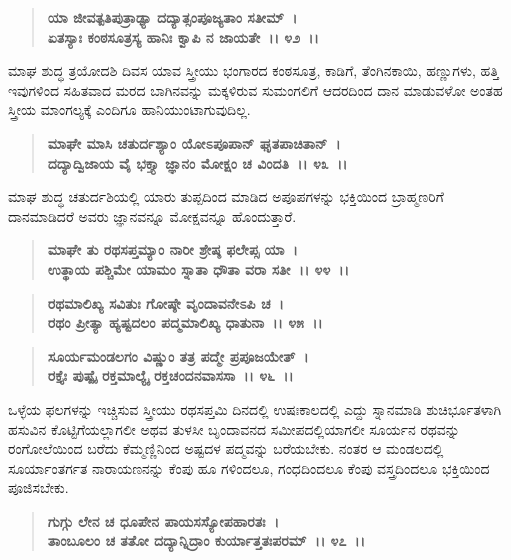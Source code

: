 \begin{verse}
\textbf{ಯಾ ಜೀವತ್ಪತಿಪುತ್ರಾಢ್ಯಾ ದದ್ಯಾತ್ಸಂಪೂಜ್ಯತಾಂ ಸತೀಮ್~।}\\\textbf{ಏತಸ್ಯಾಃ ಕಂಠಸೂತ್ರಸ್ಯ ಹಾನಿಃ ಕ್ವಾಪಿ ನ ಜಾಯತೇ~।। ೪೨~।।}
\end{verse}

ಮಾಘ ಶುದ್ಧ ತ್ರಯೋದಶಿ ದಿವಸ ಯಾವ ಸ್ತ್ರೀಯು ಭಂಗಾರದ ಕಂಠಸೂತ್ರ, ಕಾಡಿಗೆ, ತೆಂಗಿನಕಾಯಿ, ಹಣ್ಣುಗಳು, ಹತ್ತಿ ಇವುಗಳಿಂದ ಸಹಿತವಾದ ಮರದ ಬಾಗಿನವನ್ನು ಮಕ್ಕಳಿರುವ ಸುಮಂಗಲಿಗೆ ಆದರದಿಂದ ದಾನ ಮಾಡುವಳೋ ಅಂತಹ ಸ್ತ್ರೀಯ ಮಾಂಗಲ್ಯಕ್ಕೆ ಎಂದಿಗೂ ಹಾನಿಯುಂಟಾಗುವುದಿಲ್ಲ.

\begin{verse}
\textbf{ಮಾಘೇ ಮಾಸಿ ಚತುರ್ದಶ್ಯಾಂ ಯೋಽಪೂಪಾನ್ ಘೃತಪಾಚಿತಾನ್~।}\\\textbf{ದದ್ಯಾದ್ವಿಜಾಯ ವೈ ಭಕ್ತ್ಯಾ ಜ್ಞಾನಂ ಮೋಕ್ಷಂ ಚ ವಿಂದತಿ~।। ೪೩~।।}
\end{verse}

ಮಾಘ ಶುದ್ಧ ಚತುರ್ದಶಿಯಲ್ಲಿ ಯಾರು ತುಪ್ಪದಿಂದ ಮಾಡಿದ ಅಪೂಪಗಳನ್ನು ಭಕ್ತಿಯಿಂದ ಬ್ರಾಹ್ಮಣರಿಗೆ ದಾನಮಾಡಿದರೆ ಅವರು ಜ್ಞಾನವನ್ನೂ ಮೋಕ್ಷವನ್ನೂ ಹೊಂದುತ್ತಾರೆ.

\begin{verse}
\textbf{ಮಾಘೇ ತು ರಥಸಪ್ತಮ್ಯಾಂ ನಾರೀ ಶ್ರೇಷ್ಠ ಫಲೇಪ್ಸ ಯಾ~।}\\\textbf{ಉತ್ಥಾಯ ಪಶ್ಚಿಮೇ ಯಾಮಂ ಸ್ನಾತಾ ಧೌತಾ ವರಾ ಸತೀ~।। ೪೪~।। }
\end{verse}

\begin{verse}
\textbf{ರಥಮಾಲಿಖ್ಯ ಸವಿತುಃ ಗೋಷ್ಠೇ ವೃಂದಾವನೇಽಪಿ ಚ~।}\\\textbf{ರಥಂ ಪ್ರೀತ್ಯಾ ಹ್ಯಷ್ಟದಲಂ ಪದ್ಮಮಾಲಿಖ್ಯ ಧಾತುನಾ~।। ೪೫~।। }
\end{verse}

\begin{verse}
\textbf{ಸೂರ್ಯಮಂಡಲಗಂ ವಿಷ್ಣುಂ ತತ್ರ ಪದ್ಮೇ ಪ್ರಪೂಜಯೇತ್~।}\\\textbf{ರಕ್ತೈಃ ಪುಷ್ಪೈ ರಕ್ತಮಾಲ್ಯೈ ರಕ್ತಚಂದನವಾಸಸಾ~।। ೪೬~।।}
\end{verse}

ಒಳ್ಳೆಯ ಫಲಗಳನ್ನು ಇಚ್ಚಿಸುವ ಸ್ತ್ರೀಯು ರಥಸಪ್ತಮಿ ದಿನದಲ್ಲಿ ಉಷಃಕಾಲದಲ್ಲಿ ಎದ್ದು ಸ್ನಾನಮಾಡಿ ಶುಚಿರ್ಭೂತಳಾಗಿ ಹಸುವಿನ ಕೊಟ್ಟಿಗೆಯಲ್ಲಾಗಲೀ ಅಥವ ತುಳಸೀ ಬೃಂದಾವನದ ಸಮೀಪದಲ್ಲಿಯಾಗಲೀ ಸೂರ್ಯನ ರಥವನ್ನು ರಂಗೋಲೆಯಿಂದ ಬರೆದು ಕೆಮ್ಮಣ್ಣಿನಿಂದ ಅಷ್ಟದಳ ಪದ್ಮವನ್ನು ಬರೆಯಬೇಕು. ನಂತರ ಆ ಮಂಡಲದಲ್ಲಿ ಸೂರ್ಯಾಂತರ್ಗತ ನಾರಾಯಣನನ್ನು ಕೆಂಪು ಹೂ ಗಳಿಂದಲೂ, ಗಂಧದಿಂದಲೂ ಕೆಂಪು ವಸ್ತ್ರದಿಂದಲೂ ಭಕ್ತಿಯಿಂದ ಪೂಜಿಸಬೇಕು.

\begin{verse}
\textbf{ಗುಗ್ಗು ಲೇನ ಚ ಧೂಪೇನ ಪಾಯಸಸ್ಯೋಪಹಾರತಃ~।}\\\textbf{ತಾಂಬೂಲಂ ಚ ತತೋ ದದ್ಯಾನ್ನಿದ್ರಾಂ ಕುರ್ಯಾತ್ತತಃಪರಮ್~।। ೪೭~।।}
\end{verse}


